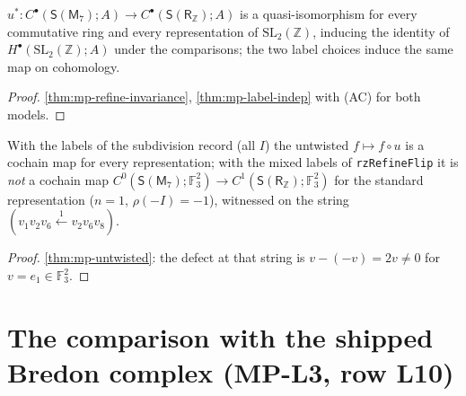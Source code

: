 \begin{theorem}\label{thm:mp-rz-refine}
  \leanok
  $u^*\colon C^\bullet(\mathsf S(\mathsf M_7);A)\to C^\bullet(\mathsf S(\mathsf R_{\mathbb Z});A)$ is a quasi-isomorphism for every commutative ring
  and every representation of $\mathrm{SL}_2(\mathbb Z)$, inducing the identity of $H^\bullet(\mathrm{SL}_2(\mathbb Z);A)$ under the comparisons;
  the two label choices induce the same map on cohomology.
\end{theorem}
\begin{proof}
  \leanok
  \ref{thm:mp-refine-invariance}, \ref{thm:mp-label-indep} with (AC) for both models.
\end{proof}

\begin{theorem}\label{thm:mp-rz-untwisted}
  \leanok
  With the labels of the subdivision record (all $I$) the untwisted $f\mapsto f\circ u$ is a cochain map for every
  representation; with the mixed labels of \texttt{rzRefineFlip} it is \emph{not} a cochain map
  $C^0(\mathsf S(\mathsf M_7);\mathbb F_3^2)\to C^1(\mathsf S(\mathsf R_{\mathbb Z});\mathbb F_3^2)$ for the standard representation ($n=1$,
  $\rho(-I)=-1$), witnessed on the string $(v_1v_2v_6\xleftarrow{1}v_2v_6v_8)$.
\end{theorem}
\begin{proof}
  \leanok
  \ref{thm:mp-untwisted}: the defect at that string is $v-(-v)=2v\neq0$ for $v=e_1\in\mathbb F_3^2$.
\end{proof}

\section{The comparison with the shipped Bredon complex (MP-L3, row L10)}

